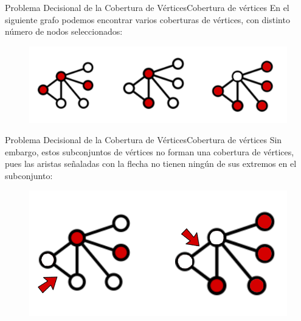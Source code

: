 \documentclass[10pt, envcountsect, presentation, aspectratio=169]{beamer}
\begin{document}
\begin{frame}{Problema Decisional de la Cobertura de Vértices}{Cobertura de vértices}
    En el siguiente grafo podemos encontrar varios coberturas de vértices, con distinto número de nodos seleccionados:
    \begin{figure}
        \includegraphics[scale=0.25]{images/T2_3_ejemploCoberturaVertices.png}
    \end{figure} 
\end{frame}

\begin{frame}{Problema Decisional de la Cobertura de Vértices}{Cobertura de vértices}
    Sin embargo, estos subconjuntos de vértices no forman una cobertura de vértices, pues las aristas señaladas con la flecha no tienen ningún de sus extremos en el subconjunto:
    \begin{figure}
        \includegraphics[scale=0.25]{images/T2_3_ejemploFalloCobertura.png}
    \end{figure} 
\end{frame}
\end{document}
